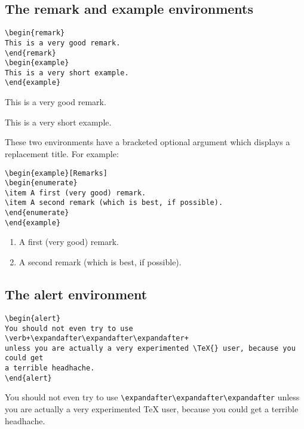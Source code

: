 \documentclass[english,ColorTheme=Red,FontSize=10pt]{tango}
\begin{document}
\subsection{The remark and  example environments}
\begin{tcolorbox}
\begin{verbatim}
\begin{remark} 
This is a very good remark.
\end{remark}
\begin{example} 
This is a very short example.
\end{example}
\end{verbatim}
\end{tcolorbox}
\begin{remark} 
This is a very good remark.
\end{remark}
\begin{example} 
This is a very short example.
\end{example}

These two environments have a bracketed optional argument which displays a replacement title. For example:
\begin{tcolorbox}
\begin{verbatim}
\begin{example}[Remarks]
\begin{enumerate}
\item A first (very good) remark.
\item A second remark (which is best, if possible).
\end{enumerate}
\end{example}
\end{verbatim}
\end{tcolorbox}
\begin{example}[Remarks]
\begin{enumerate}
\item A first (very good) remark.
\item A second remark (which is best, if possible).
\end{enumerate}
\end{example}

\subsection{The  alert environment}
\begin{tcolorbox}
\begin{verbatim}
\begin{alert}
You should not even try to use \verb+\expandafter\expandafter\expandafter+
unless you are actually a very experimented \TeX{} user, because you could get 
a terrible headhache.
\end{alert}
\end{verbatim}
\end{tcolorbox}
\begin{alert}
 You should not even try to use \verb+\expandafter\expandafter\expandafter+
unless you are actually a very experimented \TeX{} user, because you could get 
a terrible headhache.
\end{alert}
\end{document}
